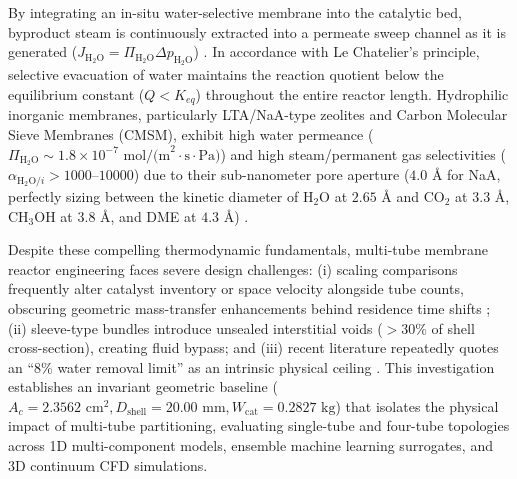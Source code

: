 \documentclass[12pt,a4paper]{article}
\begin{document}
By integrating an in-situ water-selective membrane into the catalytic bed, byproduct steam is continuously extracted into a permeate sweep channel as it is generated ($J_{\text{H}_2\text{O}} = \Pi_{\text{H}_2\text{O}} \Delta p_{\text{H}_2\text{O}}$) \cite{gallucci2013, rahimpour2007}. In accordance with Le Chatelier's principle, selective evacuation of water maintains the reaction quotient below the equilibrium constant ($Q < K_{eq}$) throughout the entire reactor length. Hydrophilic inorganic membranes, particularly LTA/NaA-type zeolites and Carbon Molecular Sieve Membranes (CMSM), exhibit high water permeance ($\Pi_{\text{H}_2\text{O}} \sim 1.8 \times 10^{-7}\text{ mol/(m}^2\cdot\text{s}\cdot\text{Pa)}$) and high steam/permanent gas selectivities ($\alpha_{\text{H}_2\text{O}/i} > 1000\text{--}10000$) due to their sub-nanometer pore aperture ($4.0\text{ \AA}$ for NaA, perfectly sizing between the kinetic diameter of $\text{H}_2\text{O}$ at $2.65\text{ \AA}$ and $\text{CO}_2$ at $3.3\text{ \AA}$, $\text{CH}_3\text{OH}$ at $3.8\text{ \AA}$, and DME at $4.3\text{ \AA}$) \cite{caro2008, seshimo2007}.

Despite these compelling thermodynamic fundamentals, multi-tube membrane reactor engineering faces severe design challenges: (i) scaling comparisons frequently alter catalyst inventory or space velocity alongside tube counts, obscuring geometric mass-transfer enhancements behind residence time shifts \cite{yeassin2026}; (ii) sleeve-type bundles introduce unsealed interstitial voids ($> 30\%$ of shell cross-section), creating fluid bypass; and (iii) recent literature repeatedly quotes an ``8\% water removal limit'' as an intrinsic physical ceiling \cite{guffanti2021}. This investigation establishes an invariant geometric baseline ($A_c = 2.3562\text{ cm}^2, D_{\text{shell}} = 20.00\text{ mm}, W_{\text{cat}} = 0.2827\text{ kg}$) that isolates the physical impact of multi-tube partitioning, evaluating single-tube and four-tube topologies across 1D multi-component models, ensemble machine learning surrogates, and 3D continuum CFD simulations.

\end{document}
